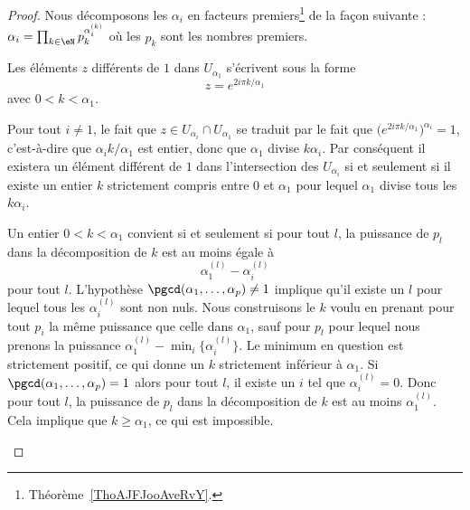 \begin{proof}
	Nous décomposons les \( \alpha_i\) en facteurs premiers\footnote{Théorème~\ref{ThoAJFJooAveRvY}.} de la façon suivante : \( \alpha_i=\prod_{k\in \eN}p_k^{\alpha_i^{(k)}}\) où les \( p_k\) sont les nombres premiers.

	\begin{subproof}
		Les éléments \( z\) différents de \( 1\) dans \( U_{\alpha_1}\) s'écrivent sous la forme
		\begin{equation}
			z= e^{2i\pi k/\alpha_1}
		\end{equation}
		avec \( 0<k<\alpha_1\).

		Pour tout \( i\neq 1\), le fait que \( z\in U_{\alpha_i}\cap U_{\alpha_1}\) se traduit par le fait que \( \big(  e^{2i\pi k/\alpha_1} \big)^{\alpha_i}=1\), c'est-à-dire que \( \alpha_ik/\alpha_1\) est entier, donc que \( \alpha_1\) divise \( k\alpha_i\). Par conséquent il existera un élément différent de \( 1\) dans l'intersection des \( U_{\alpha_i}\) si et seulement si il existe un entier \( k\) strictement compris entre \( 0\) et \( \alpha_1\) pour lequel \( \alpha_1\) divise tous les \( k\alpha_i\).

		Un entier \( 0<k<\alpha_1\) convient si et seulement si pour tout \( l\), la puissance de \( p_l\) dans la décomposition de \( k\) est au moins égale à
		\begin{equation}
			\alpha_1^{(l)}-\alpha_i^{(l)}
		\end{equation}
		pour tout \( l\).
		L'hypothèse \( \pgcd(\alpha_1,\ldots, \alpha_p)\neq 1\) implique qu'il existe un \( l\) pour lequel tous les \( \alpha_i^{(l)}\) sont non nuls. Nous construisons le \( k\) voulu en prenant pour tout \( p_i\) la même puissance que celle dans \( \alpha_1\), sauf pour \( p_l\) pour lequel nous prenons la puissance \(  \alpha_1^{(l)}-\min_i\{   \alpha_i^{(l)} \} \). Le minimum en question est strictement positif, ce qui donne un \( k\) strictement inférieur à \( \alpha_1\).
		Si \( \pgcd(\alpha_1,\ldots, \alpha_p)=1\) alors pour tout \( l\), il existe un \( i\) tel que \( \alpha_i^{(l)}=0\). Donc pour tout \( l\), la puissance de \( p_l\) dans la décomposition de \( k\) est au moins \( \alpha_1^{(l)}\). Cela implique que \( k\geq \alpha_1\), ce qui est impossible.
	\end{subproof}
\end{proof}

